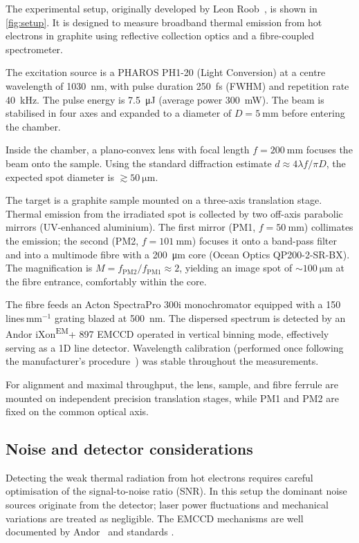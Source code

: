 \documentclass[
	parskip=half,
	a4paper,
]{scrarticle}
\begin{document}
The experimental setup, originally developed by Leon Roob~\cite{roobThermalRadiationUltrafast2025}, is shown in \autoref{fig:setup}. It is designed to measure broadband thermal emission from hot electrons in graphite using reflective collection optics and a fibre-coupled spectrometer.

The excitation source is a PHAROS PH1-20 (Light Conversion) at a centre wavelength of \SI{1030}{\nano\metre}, with pulse duration \SI{250}{\femto\second} (FWHM) and repetition rate \SI{40}{\kilo\hertz}. The pulse energy is \SI{7.5}{\micro\joule} (average power \SI{300}{\milli\watt}). The beam is stabilised in four axes and expanded to a diameter of $D=\SI{5}{\milli\metre}$ before entering the chamber.

Inside the chamber, a plano-convex lens with focal length \(f=\SI{200}{\milli\metre}\) focuses the beam onto the sample. Using the standard diffraction estimate \(d \approx 4\lambda f / \pi D\), the expected spot diameter is \(\gtrsim\SI{50}{\micro\metre}\).

The target is a graphite sample mounted on a three-axis translation stage. Thermal emission from the irradiated spot is collected by two off-axis parabolic mirrors (UV-enhanced aluminium). The first mirror (PM1, \(f=\SI{50}{\milli\metre}\)) collimates the emission; the second (PM2, \(f=\SI{101}{\milli\metre}\)) focuses it onto a band-pass filter and into a multimode fibre with a \SI{200}{\micro\metre} core (Ocean Optics QP200-2-SR-BX). The magnification is \(M = f_{\mathrm{PM2}}/f_{\mathrm{PM1}} \approx 2\), yielding an image spot of \(\sim\SI{100}{\micro\metre}\) at the fibre entrance, comfortably within the core.

The fibre feeds an Acton SpectraPro 300i monochromator equipped with a 150\,lines\,mm\(^{-1}\) grating blazed at \SI{500}{\nano\metre}. The dispersed spectrum is detected by an Andor iXon\textsuperscript{EM}+ 897 EMCCD operated in vertical binning mode, effectively serving as a 1D line detector.
Wavelength calibration (performed once following the manufacturer’s procedure~\cite{roobThermalRadiationUltrafast2025}) was stable throughout the measurements.

For alignment and maximal throughput, the lens, sample, and fibre ferrule are mounted on independent precision translation stages, while PM1 and PM2 are fixed on the common optical axis. 

\subsection{Noise and detector considerations}
Detecting the weak thermal radiation from hot electrons requires careful optimisation of the signal-to-noise ratio (SNR). In this setup the dominant noise sources originate from the detector; laser power fluctuations and mechanical variations are treated as negligible. The EMCCD mechanisms are well documented by Andor~\cite{dr.jowaltersSensitivityNoiseCCD2023,andorEstablishingSensitivityScientifica} and standards \cite{europeanmachinevisionassociationStandardCharacterizationImage2010}.
\end{document}
